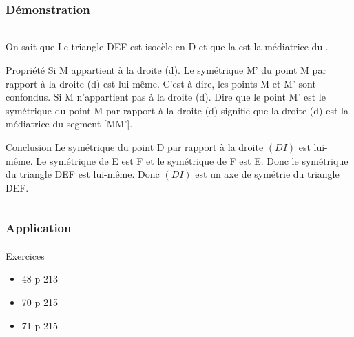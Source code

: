 \documentclass[xcolor={dvipsnames}]{beamer}
\begin{document}
\begin{frame}
\frametitle{Démonstration}  
\framesubtitle{}
	
\begin{columns}[c]
	
	
	\begin{column}{12cm}
		
		\begin{block}{On sait que}
			\small{Le triangle DEF est isocèle en D et que la  est la médiatrice du .}\pause
		\end{block}
		
		\begin{block}{Propriété}
			\small{Si M appartient à la droite (d).
			Le symétrique M' du point M par rapport à la droite (d) est lui-même.
			C'est-à-dire, les points M et M' sont confondus.
			Si M n'appartient pas à la droite (d).
			Dire que le point M' est le symétrique du point M par rapport à la droite (d) signifie que la droite (d) est la médiatrice du segment [MM'].}\pause
		\end{block}
		
		\begin{block}{Conclusion}
			\small{Le symétrique du point D par rapport à la droite $(DI)$ est lui-même.
			Le symétrique de E est F et le symétrique de F est E.
			Donc le symétrique du triangle DEF est lui-même.
			Donc $(DI)$ est un axe de symétrie du triangle DEF.}
		\end{block}
		
	\end{column}
	
	
\end{columns}
	
\end{frame}

\begin{frame}
	\frametitle{Application}  
	\framesubtitle{}
	
	\begin{block}{Exercices}
		\begin{itemize}
			\item 48 p 213
			\item 70 p 215
			\item 71 p 215
		\end{itemize}
	\end{block}
\end{frame}
\end{document}
